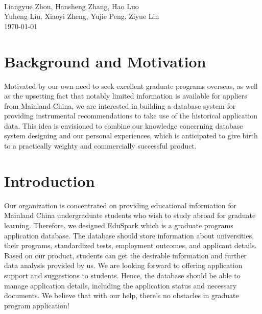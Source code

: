 \documentclass[12pt, a4paper]{article}
\begin{document}
\begin{spacing}{1.32}%


\newpage
    \begin{center}
        \Large
        \vspace{0.5cm}
        \large   
        \\Liangyue Zhou, Hansheng Zhang, Hao Luo\\Yuheng Liu, Xiaoyi Zheng, Yujie Peng, Ziyue Lin\\
        \vspace{0.5cm}
        \large
        \today
    \end{center}



\section{Background and Motivation}
Motivated by our own need to seek excellent graduate programs overseas, as well as the upsetting fact that notably limited information is available for appliers from Mainland China, we are interested in building a database system for providing instrumental recommendations to take use of the historical application data. This idea is envisioned to combine our knowledge concerning database system designing and our personal experiences, which is anticipated to give birth to a practically weighty and commercially successful product.

\section{Introduction}
Our organization is concentrated on providing educational information for Mainland China undergraduate students who wish to study abroad for graduate learning. Therefore, we designed EduSpark which is a graduate programs application database. The database should store information about universities, their programs, standardized tests, employment outcomes, and applicant details. Based on our product, students can get the desirable information and further data analysis provided by us. We are looking forward to offering application support and suggestions to students. Hence, the database should be able to manage application details, including the application status and necessary documents. We believe that with our help, there’s no obstacles in graduate program application!

\end{spacing}
\end{document}
